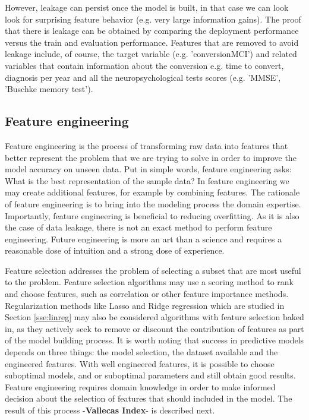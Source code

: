 \documentclass[11pt]{article}
\theoremstyle{definition}
\theoremstyle{remark}
\begin{document}
However, leakage can persist once the model is built, in that case we can look look for surprising feature behavior (e.g. very large information gains). The proof that there is leakage can be obtained by comparing the deployment performance versus the train and evaluation performance. Features that are removed to avoid leakage include, of course, the target variable (e.g. 'conversionMCI') and related variables that contain information about the conversion e.g. time to convert, diagnosis per year and all the neuropsychological tests scores (e.g. 'MMSE', 'Buschke memory test').

\subsection{Feature engineering}
\label{sse:fe}
Feature engineering is the process of transforming raw data into features that better represent the problem that we are trying to solve in order to improve the model accuracy on unseen data. 
Put in simple words, feature engineering asks: What is the best representation of the sample data?
In feature engineering we may create additional features, for example by combining features. The rationale of feature engineering is to bring into the modeling process the domain expertise. Importantly, feature engineering is beneficial to reducing overfitting. As it is also the case of data leakage, there is not an exact method to perform feature engineering. Future engineering is more an art than a science and requires a reasonable dose of intuition and a strong dose of experience.

Feature selection addresses the problem of selecting a subset that are most useful to the problem. Feature selection algorithms may use a scoring method to rank and choose features, such as correlation or other feature importance methods. Regularization methods like Lasso and Ridge regression which are studied in Section \ref{sse:linreg} may also be considered algorithms with feature selection baked in, as they actively seek to remove or discount the contribution of features as part of the model building process. 
It is worth noting that success in predictive models depends on three things: the model selection, the dataset available and the engineered features. With well engineered features, it is possible to choose suboptimal models, and or suboptimal parameters and still obtain good results. Feature engineering requires domain knowledge in order to make informed decision about the selection of features that should included in the model. The result of this process -\textbf{Vallecas Index}- is described next. 
\end{document}
